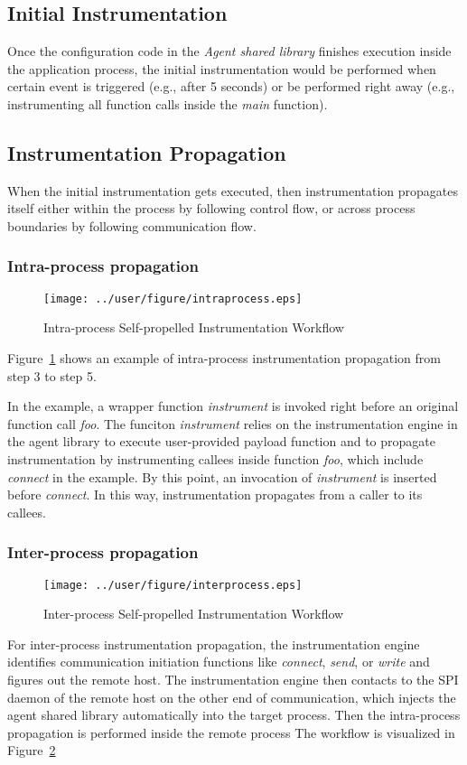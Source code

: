 \subsection{Initial Instrumentation}
Once the configuration code in the {\em Agent shared library} finishes execution
inside the application process, the initial instrumentation would be performed
when certain event is triggered (e.g., after 5 seconds) or be performed right
away (e.g., instrumenting all function calls inside the {\em main} function).

\subsection{Instrumentation Propagation}
When the initial instrumentation gets executed, then instrumentation propagates
itself either within the process by following control flow, or across process
boundaries by following communication flow.

\subsubsection{Intra-process propagation}
\begin{figure}[ht]
  \centering
  \texttt{[image: ../user/figure/intraprocess.eps]}
  \caption{Intra-process Self-propelled Instrumentation Workflow}
   \label{fig:intrainst}
\end{figure}


Figure~\ref{fig:intrainst} shows an example of intra-process instrumentation
propagation from step 3 to step 5.

In the example, a wrapper function {\em instrument} is invoked right before an
original function call {\em foo}.  The funciton {\em instrument} relies on the
instrumentation engine in the agent library to execute user-provided payload
function and to propagate instrumentation by instrumenting callees inside
function {\em foo}, which include {\em connect} in the example. By this point,
an invocation of {\em instrument} is inserted before {\em connect}. In this way,
instrumentation propagates from a caller to its callees.

\subsubsection{Inter-process propagation}
\begin{figure}[ht]
  \centering
  \texttt{[image: ../user/figure/interprocess.eps]}
  \caption{Inter-process Self-propelled Instrumentation Workflow}
  \label{fig:interinst}
\end{figure}

For inter-process instrumentation propagation, the instrumentation engine
identifies communication initiation functions like {\em connect}, {\em send}, or
{\em write} and figures out the remote host.  The instrumentation engine then
contacts to the SPI daemon of the remote host on the other end of communication,
which injects the agent shared library automatically into the target process.
Then the intra-process propagation is performed inside the remote process The
workflow is visualized in Figure~\ref{fig:interinst}
